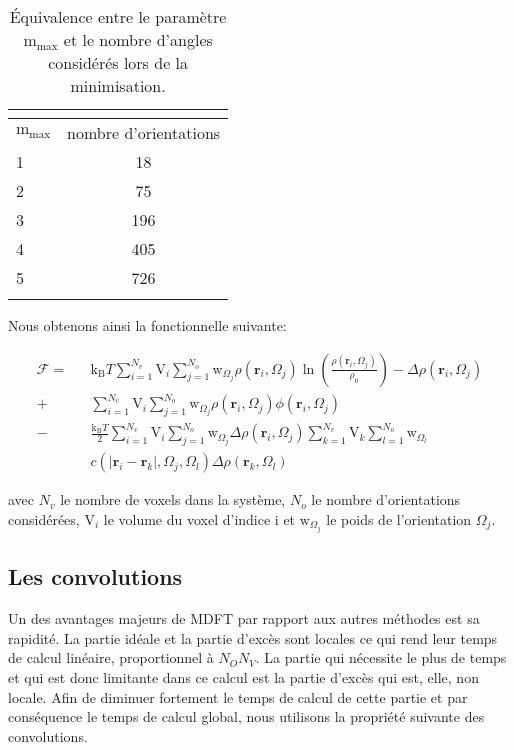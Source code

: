 \begin{table}[H]
 \centering
  \begin{tabular}{l | c }
    \hline \multicolumn{2}{c}{} \\[-1em]\hline
    $\mathrm{m}_\mathrm{max}$ & nombre d'orientations \\
    \hline
    1  & 18 \\
    2  & 75 \\
    3  & 196 \\
    4  & 405 \\
    5  & 726 \\
    \hline \multicolumn{2}{c}{} \\[-1em]\hline
  \end{tabular}
  \caption[\'Equivalence entre le paramètre $\mathrm{m}_\mathrm{max}$ et le nombre d'angles.]{\'Equivalence entre le paramètre $\mathrm{m}_\mathrm{max}$ et le nombre d'angles considérés lors de la minimisation.}
  \label{tab:mmax}  
\end{table}


Nous obtenons ainsi la fonctionnelle suivante:



\begin{eqnarray}
\mathcal{F} =& &\mathrm{k_B}T \sum\limits_{i=1}^{N_v}\mathrm{V}_i\sum\limits_{j=1}^{N_o}\mathrm{w}_{\Omega_j} \rho\left(\boldsymbol{r}_i,\Omega_j\right)\ln\left(\frac{\rho\left(\boldsymbol{r}_i,\Omega_j\right)}{\rho_0}\right)-\Delta\rho\left(\boldsymbol{r}_i,\Omega_j\right)\\
			+& &\sum\limits_{i=1}^{N_v}\mathrm{V}_i\sum\limits_{j=1}^{N_o}\mathrm{w}_{\Omega_j} \rho\left(\boldsymbol{r}_i,\Omega_j\right)\phi\left(\boldsymbol{r}_i,\Omega_j\right)\\
            -& &\frac{\mathrm{k_B}T}{2}\sum\limits_{i=1}^{N_v}\mathrm{V}_i\sum\limits_{j=1}^{N_o}\mathrm{w}_{\Omega_j} \Delta\rho\left(\boldsymbol{r}_i,\Omega_j\right) \sum\limits_{k=1}^{N_v}\mathrm{V}_k\sum\limits_{l=1}^{N_o} \mathrm{w}_{\Omega_l}\\
            & &c\left( \left|\boldsymbol{r}_i-\boldsymbol{r}_k\right|,\Omega_j,\Omega_l \right) \Delta\rho\left(\boldsymbol{r}_k,\Omega_l\right) \nonumber 
\end{eqnarray}


\noindent avec $N_v$ le nombre de voxels dans la système, $N_o$ le nombre d'orientations considérées, $\mathrm{V}_i$ le volume du voxel d'indice i et $\mathrm{w}_{\Omega_j}$ le poids de l'orientation $\Omega_j$.


\subsection{Les convolutions}
Un des avantages majeurs de MDFT par rapport aux autres méthodes est sa rapidité. La partie idéale et la partie d'excès sont locales ce qui rend leur temps de calcul linéaire, proportionnel à $N_O N_V$. La partie qui nécessite le plus de temps et qui est donc limitante dans ce calcul est la partie d'excès qui est, elle, non locale. Afin de diminuer fortement le temps de calcul de cette partie et par conséquence le temps de calcul global, nous utilisons la propriété suivante des convolutions.

